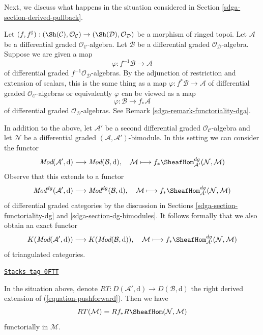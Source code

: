 Next, we discuss what happens in the situation considered in
Section \ref{sdga-section-derived-pullback}.

\medskip\noindent
Let $(f, f^\sharp) : (\Sh(\mathcal{C}), \mathcal{O}_\mathcal{C})
\to (\Sh(\mathcal{D}), \mathcal{O}_\mathcal{D})$
be a morphism of ringed topoi. Let $\mathcal{A}$ be a differential
graded $\mathcal{O}_\mathcal{C}$-algebra. Let $\mathcal{B}$ be a
differential graded $\mathcal{O}_\mathcal{D}$-algebra.
Suppose we are given a map
$$
\varphi : f^{-1}\mathcal{B} \to \mathcal{A}
$$
of differential graded $f^{-1}\mathcal{O}_\mathcal{D}$-algebras.
By the adjunction of restriction and extension of scalars, this
is the same thing as a map $\varphi : f^*\mathcal{B} \to \mathcal{A}$
of differential graded $\mathcal{O}_\mathcal{C}$-algebras or equivalently
$\varphi$ can be viewed as a map
$$
\varphi : \mathcal{B} \to f_*\mathcal{A}
$$
of differential graded $\mathcal{O}_\mathcal{D}$-algebras.
See Remark \ref{sdga-remark-functoriality-dga}.

\medskip\noindent
In addition to the above, let $\mathcal{A}'$ be a second differential
graded $\mathcal{O}_\mathcal{C}$-algebra and let $\mathcal{N}$
be a differential graded $(\mathcal{A}, \mathcal{A}')$-bimodule.
In this setting we can consider the functor
$$
\textit{Mod}(\mathcal{A}', \text{d})
\longrightarrow
\textit{Mod}(\mathcal{B}, \text{d}),\quad
\mathcal{M} \longmapsto
f_*\SheafHom^{dg}_{\mathcal{A}'}(\mathcal{N}, \mathcal{M})
$$
Observe that this extends to a functor
$$
\textit{Mod}^{dg}(\mathcal{A}', \text{d})
\longrightarrow
\textit{Mod}^{dg}(\mathcal{B}, \text{d}),\quad
\mathcal{M} \longmapsto
f_*\SheafHom^{dg}_{\mathcal{A}'}(\mathcal{N}, \mathcal{M})
$$
of differential graded categories by the discussion in
Sections \ref{sdga-section-functoriality-dg} and \ref{sdga-section-dg-bimodules}.
It follows formally that we also obtain an exact functor
\begin{equation}
\label{equation-pushforward}
K(\textit{Mod}(\mathcal{A}', \text{d}))
\longrightarrow
K(\textit{Mod}(\mathcal{B}, \text{d})),\quad
\mathcal{M} \longmapsto
f_*\SheafHom^{dg}_{\mathcal{A}'}(\mathcal{N}, \mathcal{M})
\end{equation}
of triangulated categories.

\begin{lemma}
\label{sdga-lemma-compose-pushforward-hom}
\href{https://stacks.math.columbia.edu/tag/0FTT}{\texttt{Stacks tag 0FTT}}

In the situation above, denote $RT : D(\mathcal{A}', \text{d}) \to
D(\mathcal{B}, \text{d})$ the right derived extension of
(\ref{equation-pushforward}). Then we have
$$
RT(\mathcal{M}) = Rf_* R\SheafHom(\mathcal{N}, \mathcal{M})
$$
functorially in $\mathcal{M}$.
\end{lemma}

